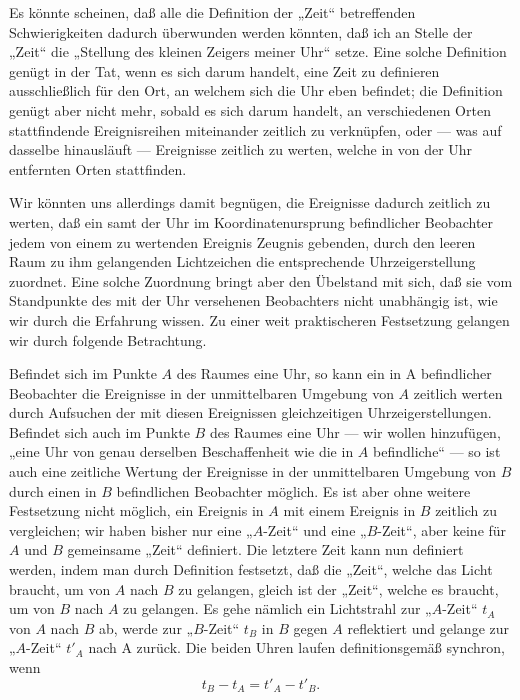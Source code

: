 \documentclass[17pt]{webarticle}       %
\begin{document}
Es könnte scheinen, daß alle die Definition der „Zeit“ betreffenden Schwierigkeiten dadurch überwunden werden könnten, daß ich an Stelle der „Zeit“ die „Stellung des kleinen Zeigers meiner Uhr“ setze. Eine solche Definition genügt in der Tat, wenn es sich darum handelt, eine Zeit zu definieren ausschließlich für den Ort, an welchem sich die Uhr eben befindet; die Definition genügt aber nicht mehr, sobald es sich darum handelt, an verschiedenen Orten stattfindende Ereignisreihen miteinander zeitlich zu verknüpfen, oder — was auf dasselbe hinausläuft — Ereignisse zeitlich zu werten, welche in von der Uhr entfernten Orten stattfinden.

Wir könnten uns allerdings damit begnügen, die Ereignisse dadurch zeitlich zu werten, daß ein samt der Uhr im Koordinatenursprung befindlicher Beobachter jedem von einem zu wertenden Ereignis Zeugnis gebenden, durch den leeren Raum zu ihm gelangenden Lichtzeichen die entsprechende Uhrzeigerstellung zuordnet. Eine solche Zuordnung bringt aber den Übelstand mit sich, daß sie vom Standpunkte des mit der Uhr versehenen Beobachters nicht unabhängig ist, wie wir durch die Erfahrung wissen. Zu einer weit praktischeren Festsetzung gelangen wir durch folgende Betrachtung.

Befindet sich im Punkte \( A \) des Raumes eine Uhr, so kann ein in A befindlicher Beobachter die Ereignisse in der unmittelbaren Umgebung von \( A \) zeitlich werten durch Aufsuchen der mit diesen Ereignissen gleichzeitigen Uhrzeigerstellungen. Befindet sich auch im Punkte \( B \) des Raumes eine Uhr — wir wollen hinzufügen, „eine Uhr von genau derselben Beschaffenheit wie die in \( A \) befindliche“ — so ist auch eine zeitliche Wertung der Ereignisse in der unmittelbaren Umgebung von \( B \) durch einen in \( B \) befindlichen Beobachter möglich. Es ist aber ohne weitere Festsetzung nicht möglich, ein Ereignis in \( A \) mit einem Ereignis in \( B \) zeitlich zu vergleichen; wir haben bisher nur eine „\( A \)-Zeit“ und eine „\( B \)-Zeit“, aber keine für \( A \) und \( B \) gemeinsame „Zeit“ definiert. Die letztere Zeit kann nun definiert werden, indem man durch Definition festsetzt, daß die „Zeit“, welche das Licht braucht, um von \( A \) nach \( B \) zu gelangen, gleich ist der „Zeit“, welche es braucht, um von \( B \) nach \( A \) zu gelangen. Es gehe nämlich ein Lichtstrahl zur „\( A \)-Zeit“ \( t_A \) von \( A \) nach \( B \) ab, werde zur „\( B \)-Zeit“ \( t_B \) in \( B \) gegen \( A \) reflektiert und gelange zur „\( A \)-Zeit“ $t'_A$ nach A zurück. Die beiden Uhren laufen definitionsgemäß synchron, wenn
\[
t_B - t_A = t'_A - t'_B .
\]
\end{document}
